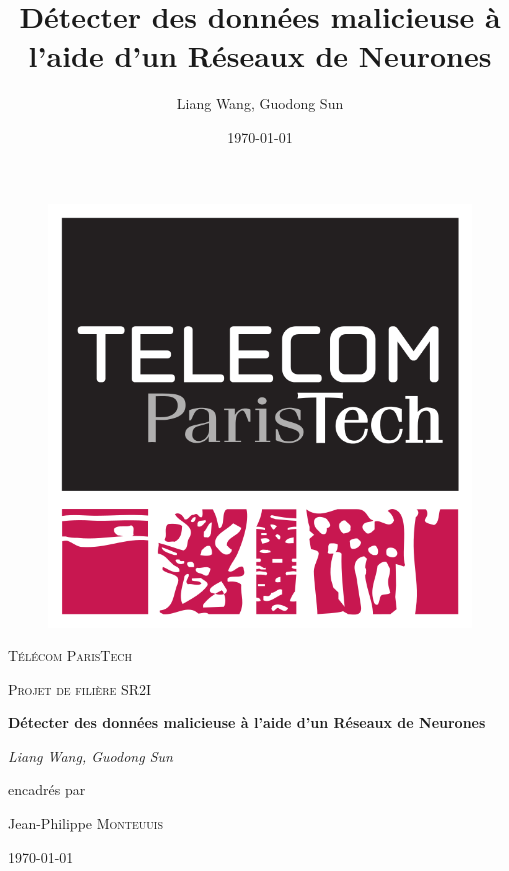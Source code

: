 \documentclass[a4paper]{report}
\title{Détecter des données malicieuse à l'aide d'un Réseaux de Neurones }
\author{Liang Wang, Guodong Sun}
\date{\today}
\begin{document}
\begin{titlepage}
	\centering
	\vspace{1cm}
\begin{figure}
	\centering
	\includegraphics[scale=0.2]{img/logo_TPT.png}
\end{figure}
	\vspace{1cm}
	{\scshape\LARGE Télécom ParisTech \par}
	\vspace{1cm}
	{\scshape\Large Projet de filière SR2I \par}
	\vspace{1.5cm}
	{\huge\bfseries Détecter des données malicieuse à l'aide d'un Réseaux de Neurones\par}
	\vspace{2cm}
	{\Large\itshape Liang Wang, Guodong Sun \par}
	\vfill
	encadrés par\par
	Jean-Philippe \textsc{Monteuuis}
	\vfill

	{\large \today\par}
\end{titlepage}
	
\begin{abstract}
	
\end{abstract}
\end{document}
